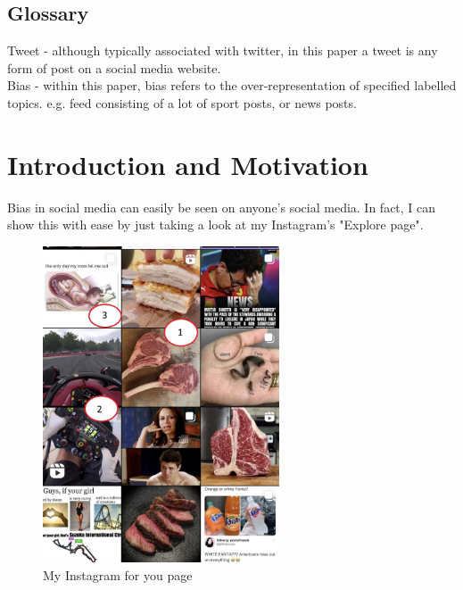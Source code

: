 \documentclass[a4paper,fleqn,10pt]{article}
\begin{document}


\pagestyle{plain}

\subsection{Glossary}
Tweet - although typically associated with twitter, in this paper a tweet is any form of post on a social media website.\\
Bias - within this paper, bias refers to the over-representation of specified labelled topics. e.g. feed consisting of a lot of sport
posts, or news posts.

\section{Introduction and Motivation}
\label{sec:intro}


Bias in social media can easily be seen on anyone's social media. In fact, I can show this with ease by just taking a look at my
Instagram's "Explore page".
\begin{figure}[htbp]
    \centering
    \includegraphics[width=70mm]{../images/ig4u.jpg}
    \caption{My Instagram for you page}
    \label{fig:ig4u}
\end{figure}
\end{document}
